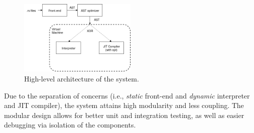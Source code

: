 {%
\begin{figure}
        \includegraphics[width=0.5\textwidth]{architecture.png}
    \caption{High-level architecture of the system.}
    \label{arch1}
\end{figure}
}

Due to the separation of concerns (i.e., \textit{static} front-end 
and \textit{dynamic} interpreter and JIT compiler), the system attains
high modularity and less coupling. The modular design
allows for better unit and integration testing, as well as
easier debugging via isolation of the components.

